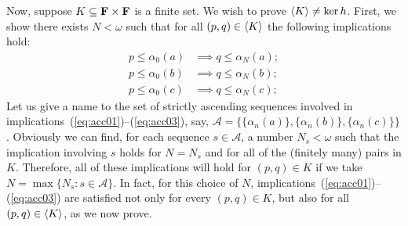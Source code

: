Now, suppose $K \subseteq \mathbf{F} \times \mathbf{F}$ is a finite set. 
We wish to prove $\langle K\rangle \neq \ker h$.
First, we show there exists $N < \omega$ such that 
for all $(p, q) \in \langle K\rangle$ 
the following implications hold:
\begin{align}
  p \leq \alpha_0(a) &\implies q \leq \alpha_N(a); \label{eq:acc01}\\
  p \leq \alpha_0(b) &\implies q \leq \alpha_N(b); \label{eq:acc02}\\ 
  p \leq \alpha_0(c) &\implies q \leq \alpha_N(c); \label{eq:acc03}
\end{align}
Let us give a name to the set of strictly ascending 
sequences involved in implications~(\ref{eq:acc01})--(\ref{eq:acc03}), say, 
$\mathcal A = \{\{\alpha_n(a)\}, \{\alpha_n(b)\}, \{\alpha_n(c)\}\}$. %
Obviously we can find, for each sequence $s \in \mathcal A$, %
a number $N_s < \omega$ such that the implication involving $s$
holds for $N = N_s$ and for all of the (finitely many) pairs in $K$.  
Therefore, all of these implications will hold for $(p, q) \in K$ if we take 
$N = \max \{N_{s} : s \in \mathcal A\}$. %
In fact, for this choice of $N$, implications~(\ref{eq:acc01})--(\ref{eq:acc03}) 
are satisfied not only for every $(p, q) \in K$, but also for all $(p, q) \in \langle K\rangle$,
as we now prove.

